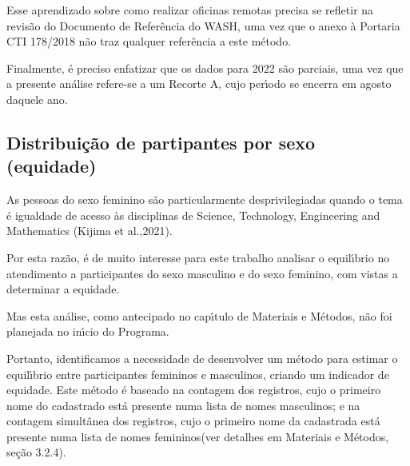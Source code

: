 \documentclass[
12pt,		%
openright,	%
twoside,  %
a4paper,			%
chapter=TITLE,		%
english,			%
french,				%
spanish,			%
brazil				%
]{USPSC-classe/USPSC}
\begin{document}
Esse aprendizado sobre como realizar oficinas remotas precisa se refletir na revis\~ao do Documento de Refer\^encia do WASH, uma vez que o anexo \`a Portaria CTI 178/2018 n\~ao traz qualquer refer\^encia a este m\'etodo.









Finalmente, \'e preciso enfatizar que os dados para 2022 s\~ao parciais, uma vez que a presente an\'alise refere-se a um Recorte A, cujo per\'{\i}odo se encerra em agosto daquele ano.









\subsection[Distribui\c{c}\~ao de partipantes por sexo (equidade)]{Distribui\c{c}\~ao de partipantes por sexo (equidade)}\label{Distribui\c{c}\~ao de partipantes por sexo (equidade)}
As pessoas do sexo feminino s\~ao particularmente desprivilegiadas quando o tema \'e igualdade de acesso \`as disciplinas de Science, Technology, Engineering and Mathematics (Kijima et al.,2021).









Por esta raz\~ao, \'e de muito interesse para este trabalho analisar o equil\'{\i}brio no atendimento a participantes do sexo masculino e do sexo feminino, com vistas a determinar a equidade.









Mas esta an\'alise, como antecipado no cap\'{\i}tulo de Materiais e M\'etodos, n\~ao foi planejada no in\'{\i}cio do Programa.









Portanto, identificamos a necessidade de desenvolver um m\'etodo para estimar o equil\'{\i}brio entre participantes femininos e masculinos, criando um indicador de equidade. Este m\'etodo \'e baseado na contagem dos registros, cujo o primeiro nome do cadastrado est\'a presente numa lista de \textquotedbl nomes masculinos\textquotedbl ; e na contagem simult\^anea dos registros, cujo o primeiro nome da cadastrada est\'a presente numa lista de \textquotedbl  nomes femininos\textquotedbl  (ver detalhes em Materiais e M\'etodos, se\c{c}\~ao 3.2.4).
\end{document}
